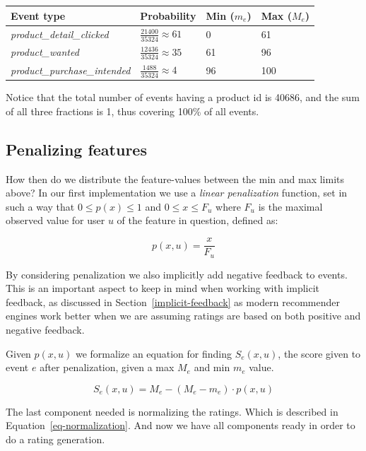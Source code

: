 \begin{table}[H]
  \centering
  \begin{tabular}{llll}
    \toprule
      Event type & Probability & Min ($m_e$) & Max ($M_e$) \\
    \midrule
      \textit{product\_detail\_clicked}     & $\frac{21400}{35324} \approx 61$  & 0   & 61  \\[1.5ex]
      \textit{product\_wanted}              & $\frac{12436}{35324} \approx 35$  & 61  & 96  \\[1.5ex]
      \textit{product\_purchase\_intended}  & $\frac{1488}{35324} \approx 4$    & 96  & 100 \\
    \bottomrule
  \end{tabular}
\end{table}

Notice that the total number of events having a product id is 40686, and the
sum of all three fractions is 1, thus covering 100\% of all events.

\subsection{Penalizing features}

How then do we distribute the feature-values  between the min and max limits
above? In our first implementation we use a \textit{linear penalization}
function, set in such a way that $0 \leq p(x) \leq 1$ and $0 \leq x \leq F_u$
where $F_u$ is the maximal observed value for user $u$ of the feature in
question, defined as:

\begin{equation}
  p(x, u) = \frac{x}{F_u}
\end{equation}

By considering penalization we also implicitly add negative feedback to events.
This is an important aspect to keep in mind when working with implicit
feedback, as discussed in Section~\ref{implicit-feedback} as modern recommender
engines work better when we are assuming ratings are based on both positive and
negative feedback.

Given $p(x, u)$ we formalize an equation for finding $S_e(x, u)$, the score
given to event $e$ after penalization, given a max $M_e$ and min $m_e$ value.

\begin{equation}
  S_e(x,u) = M_e - (M_e - m_e) \cdot p(x, u)
\end{equation}

The last component needed is normalizing the ratings. Which is described in
Equation~\ref{eq-normalization}. And now we have all components ready in order
to do a rating generation.

